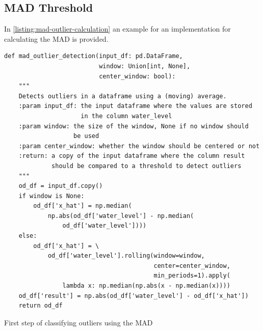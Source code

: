 \subsection{MAD Threshold}
In \autoref{listing:mad-outlier-calculation} an example for an implementation for calculating the \ac{MAD} is provided.
\begin{listing}
\begin{verbatim}
def mad_outlier_detection(input_df: pd.DataFrame,
                          window: Union[int, None],
                          center_window: bool):
    """
    Detects outliers in a dataframe using a (moving) average.
    :param input_df: the input dataframe where the values are stored
                     in the column water_level
    :param window: the size of the window, None if no window should
                   be used
    :param center_window: whether the window should be centered or not
    :return: a copy of the input dataframe where the column result
             should be compared to a threshold to detect outliers
    """
    od_df = input_df.copy()
    if window is None:
        od_df['x_hat'] = np.median(
            np.abs(od_df['water_level'] - np.median(
                od_df['water_level'])))
    else:
        od_df['x_hat'] = \
            od_df['water_level'].rolling(window=window,
                                         center=center_window,
                                         min_periods=1).apply(
                lambda x: np.median(np.abs(x - np.median(x))))
    od_df['result'] = np.abs(od_df['water_level'] - od_df['x_hat'])
    return od_df
\end{verbatim}
\caption{First step of classifying outliers using the \ac{MAD}}
\label{listing:mad-outlier-calculation}
\end{listing}

